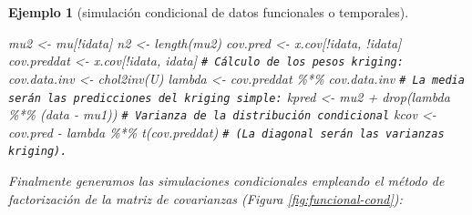 \documentclass[
  10pt,
]{book}
\newenvironment{Shaded}{\begin{snugshade}}{\end{snugshade}}
\newcommand{\CommentTok}[1]{\textcolor[rgb]{0.56,0.35,0.01}{\textit{#1}}}
\newcommand{\FunctionTok}[1]{\textcolor[rgb]{0.00,0.00,0.00}{#1}}
\newcommand{\NormalTok}[1]{#1}
\newcommand{\OtherTok}[1]{\textcolor[rgb]{0.56,0.35,0.01}{#1}}
\newcommand{\SpecialCharTok}[1]{\textcolor[rgb]{0.00,0.00,0.00}{#1}}
\theoremstyle{break}
\newtheorem{example}{Ejemplo}[chapter]
\theoremstyle{nonumberplain}
\renewcommand{\CommentTok}[1]{\textcolor[rgb]{0.41,0.41,0.41}{\texttt{#1}}}
\begin{document}
\begin{example}[simulación condicional de datos funcionales o temporales]
\begin{Shaded}
\begin{Highlighting}[]
\NormalTok{mu2 }\OtherTok{\textless{}{-}}\NormalTok{ mu[}\SpecialCharTok{!}\NormalTok{idata]}
\NormalTok{n2 }\OtherTok{\textless{}{-}} \FunctionTok{length}\NormalTok{(mu2)}
\NormalTok{cov.pred }\OtherTok{\textless{}{-}}\NormalTok{ x.cov[}\SpecialCharTok{!}\NormalTok{idata, }\SpecialCharTok{!}\NormalTok{idata]}
\NormalTok{cov.preddat }\OtherTok{\textless{}{-}}\NormalTok{ x.cov[}\SpecialCharTok{!}\NormalTok{idata, idata]}
\CommentTok{\# Cálculo de los pesos kriging:}
\NormalTok{cov.data.inv }\OtherTok{\textless{}{-}} \FunctionTok{chol2inv}\NormalTok{(U)}
\NormalTok{lambda }\OtherTok{\textless{}{-}}\NormalTok{ cov.preddat }\SpecialCharTok{\%*\%}\NormalTok{ cov.data.inv}
\CommentTok{\# La media serán las predicciones del kriging simple:}
\NormalTok{kpred }\OtherTok{\textless{}{-}}\NormalTok{ mu2 }\SpecialCharTok{+} \FunctionTok{drop}\NormalTok{(lambda }\SpecialCharTok{\%*\%}\NormalTok{ (data }\SpecialCharTok{{-}}\NormalTok{ mu1))}
\CommentTok{\# Varianza de la distribución condicional}
\NormalTok{kcov }\OtherTok{\textless{}{-}}\NormalTok{ cov.pred }\SpecialCharTok{{-}}\NormalTok{  lambda }\SpecialCharTok{\%*\%} \FunctionTok{t}\NormalTok{(cov.preddat)}
\CommentTok{\# (La diagonal serán las varianzas kriging). }
\end{Highlighting}
\end{Shaded}

Finalmente generamos las simulaciones condicionales empleando el método de factorización de la matriz de covarianzas (Figura \ref{fig:funcional-cond}):




\end{example}
\end{document}
